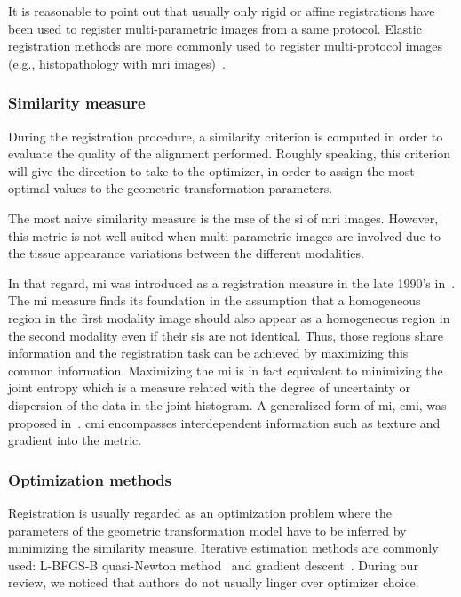 It is reasonable to point out that usually only rigid or affine registrations have been used to register multi-parametric images from a same protocol. Elastic registration methods are more commonly used to register multi-protocol images (e.g., histopathology with \ac{mri} images)~\cite{Toth2008,Toth2009}.

\subsubsection{Similarity measure}\label{subsubsec:simmea}

During the registration procedure, a similarity criterion is computed in order to evaluate the quality of the alignment performed. Roughly speaking, this criterion will give the direction to take to the optimizer, in order to assign the most optimal values to the geometric transformation parameters.

The most naive similarity measure is the \acf{mse} of the \ac{si} of \ac{mri} images. However, this metric is not well suited when multi-parametric images are involved due to the tissue appearance variations between the different modalities.

In that regard, \ac{mi} was introduced as a registration measure in the late 1990's in~\cite{Pluim2003}. The \ac{mi} measure finds its foundation in the assumption that a homogeneous region in the first modality image should also appear as a homogeneous region in the second modality even if their \acp{si} are not identical. Thus, those regions share information and the registration task can be achieved by maximizing this common information. Maximizing the \ac{mi} is in fact equivalent to minimizing the joint entropy which is a measure related with the degree of uncertainty or dispersion of the data in the joint histogram. A generalized form of \ac{mi}, \ac{cmi}, was proposed in~\cite{Chappelow2011}. \ac{cmi} encompasses interdependent information such as texture and gradient into the metric.

\subsubsection{Optimization methods}\label{subsubsec:optmea}

Registration is usually regarded as an optimization problem where the parameters of the geometric transformation model have to be inferred by minimizing the similarity measure. Iterative estimation methods are commonly used: L-BFGS-B quasi-Newton method~\cite{Byrd1995} and gradient descent~\cite{Viola1997}. During our review, we noticed that authors do not usually linger over optimizer choice.

